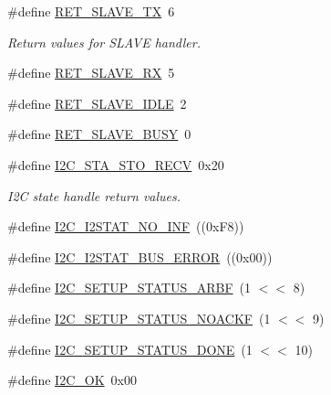 \begin{DoxyCompactItemize}
\item 
\#define \hyperlink{group___i2_c__18_x_x__43_x_x_ga49da135773ab760dbf75fcbcdb383623}{R\+E\+T\+\_\+\+S\+L\+A\+V\+E\+\_\+\+TX}~6
\begin{DoxyCompactList}\small\item\em Return values for S\+L\+A\+VE handler. \end{DoxyCompactList}\item 
\#define \hyperlink{group___i2_c__18_x_x__43_x_x_ga16246f0e987c65b12170dd4f127e99f9}{R\+E\+T\+\_\+\+S\+L\+A\+V\+E\+\_\+\+RX}~5
\item 
\#define \hyperlink{group___i2_c__18_x_x__43_x_x_gac3305a3a03ff55a1ee6ba304a09e0187}{R\+E\+T\+\_\+\+S\+L\+A\+V\+E\+\_\+\+I\+D\+LE}~2
\item 
\#define \hyperlink{group___i2_c__18_x_x__43_x_x_gae5dd077e6273af4e15c3b656b56f9afd}{R\+E\+T\+\_\+\+S\+L\+A\+V\+E\+\_\+\+B\+U\+SY}~0
\item 
\#define \hyperlink{group___i2_c__18_x_x__43_x_x_ga6ed81fd3a1ae05f1fbf96525f1520cd3}{I2\+C\+\_\+\+S\+T\+A\+\_\+\+S\+T\+O\+\_\+\+R\+E\+CV}~0x20
\begin{DoxyCompactList}\small\item\em I2C state handle return values. \end{DoxyCompactList}\item 
\#define \hyperlink{group___i2_c__18_x_x__43_x_x_ga3e2ecdeb466041bb3cf435ccf36564d9}{I2\+C\+\_\+\+I2\+S\+T\+A\+T\+\_\+\+N\+O\+\_\+\+I\+NF}~((0x\+F8))
\item 
\#define \hyperlink{group___i2_c__18_x_x__43_x_x_ga7c1e7f0f166cdc547263229c5ce07cb0}{I2\+C\+\_\+\+I2\+S\+T\+A\+T\+\_\+\+B\+U\+S\+\_\+\+E\+R\+R\+OR}~((0x00))
\item 
\#define \hyperlink{group___i2_c__18_x_x__43_x_x_gae90c077796281121b65b80b661a23062}{I2\+C\+\_\+\+S\+E\+T\+U\+P\+\_\+\+S\+T\+A\+T\+U\+S\+\_\+\+A\+R\+BF}~(1 $<$$<$ 8)
\item 
\#define \hyperlink{group___i2_c__18_x_x__43_x_x_ga90a37b470118d82b9682cfc2e0b4de84}{I2\+C\+\_\+\+S\+E\+T\+U\+P\+\_\+\+S\+T\+A\+T\+U\+S\+\_\+\+N\+O\+A\+C\+KF}~(1 $<$$<$ 9)
\item 
\#define \hyperlink{group___i2_c__18_x_x__43_x_x_gaefbb25ca99e199765e7dcdd6ef343590}{I2\+C\+\_\+\+S\+E\+T\+U\+P\+\_\+\+S\+T\+A\+T\+U\+S\+\_\+\+D\+O\+NE}~(1 $<$$<$ 10)
\item 
\#define \hyperlink{group___i2_c__18_x_x__43_x_x_ga57d0c95ccd7c129288743e9674a9e96d}{I2\+C\+\_\+\+OK}~0x00
\item 
$$
\end{DoxyCompactItemize}
